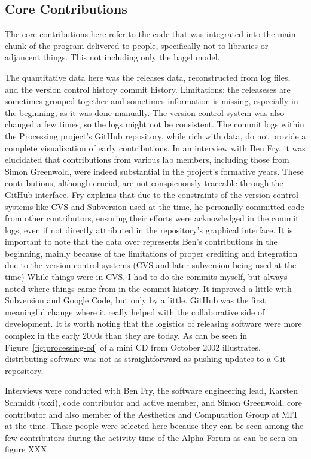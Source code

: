 \subsection{Core Contributions}
The core contributions here refer to the code that was integrated into the main chunk of the program delivered to people, specifically not to libraries or adjancent things. This not including only the bagel model.

The quantitative data here was the releases data, reconstructed from log files, and the version control history commit history. Limitations: the releaseses are sometimes grouped together and sometimes information is missing, especially in the beginning, as it was done manually. The version control system was also changed a few times, so the logs might not be consistent. 
The commit logs within the Processing project's GitHub repository, while rich with data, do not provide a complete visualization of early contributions. In an interview with Ben Fry, it was elucidated that contributions from various lab members, including those from Simon Greenwold, were indeed substantial in the project's formative years. These contributions, although crucial, are not conspicuously traceable through the GitHub interface. Fry explains that due to the constraints of the version control systems like CVS and Subversion used at the time, he personally committed code from other contributors, ensuring their efforts were acknowledged in the commit logs, even if not directly attributed in the repository's graphical interface.
It is important to note that the data over represents Ben's contributions in the beginning, mainly because of the limitations of proper crediting and integration due to the version control systems (CVS and later subversion being used at the time)
While things were in CVS, I had to do the commits myself, but always noted where things came from in the commit history. It improved a little with Subversion and Google Code, but only by a little. GitHub was the first meaningful change where it really helped with the collaborative side of development. 
It is worth noting that the logistics of releasing software were more complex in the early 2000s than they are today. As can be seen in Figure~\ref{fig:processing-cd} of a mini CD from October 2002 illustrates, distributing software was not as straightforward as pushing updates to a Git repository.

Interviews were conducted with Ben Fry, the software engineering lead, Karsten Schmidt (toxi), code contributor and active member, and Simon Greenwold, core contributor and also member of the Aesthetics and Computation Group at MIT at the time. These people were selected here because they can be seen among the few contributors during the activity time of the Alpha Forum as can be seen on figure XXX. 

